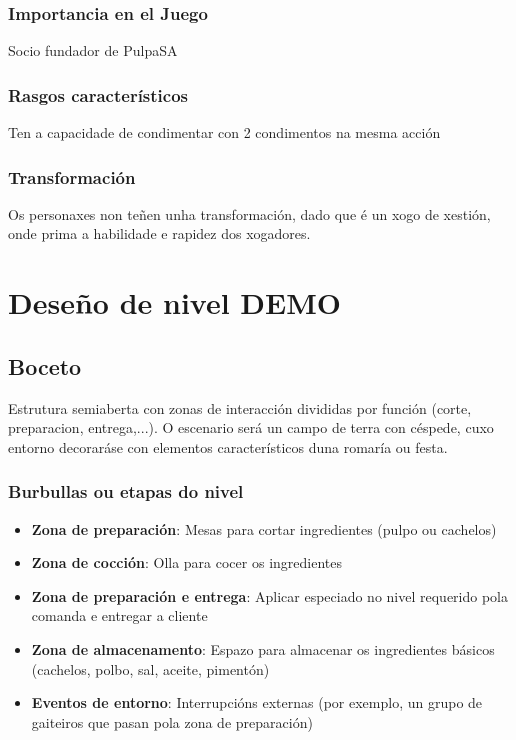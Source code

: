 \documentclass{report}  %
\begin{document}
\subsubsection{Importancia en el Juego}
Socio fundador de PulpaSA \footnotemark[1]
\subsubsection{Rasgos característicos}
Ten a capacidade de condimentar con 2 condimentos na mesma acción \footnotemark[2]
\subsubsection{Transformación}
Os personaxes non teñen unha transformación, dado que é un xogo de xestión, onde prima a habilidade e rapidez dos xogadores.


\newpage
\section{Deseño de nivel DEMO}
\subsection{Boceto}
Estrutura semiaberta con zonas de interacción divididas por función (corte, preparacion, entrega,...). O escenario
será un campo de terra con céspede, cuxo entorno decoraráse con elementos característicos duna romaría ou festa.

\subsubsection{Burbullas ou etapas do nivel}
\begin{itemize}
    \item \textbf{Zona de preparación}: Mesas para cortar ingredientes (pulpo ou cachelos)
    \item \textbf{Zona de cocción}: Olla para cocer os ingredientes
    \item \textbf{Zona de preparación e entrega}: Aplicar especiado no nivel requerido pola comanda e entregar a cliente
    \item \textbf{Zona de almacenamento}: Espazo para almacenar os ingredientes básicos (cachelos, polbo, sal, aceite, pimentón)
    \item \textbf{Eventos de entorno}: Interrupcións externas (por exemplo, un grupo de gaiteiros que pasan pola zona de preparación)
\end{itemize}
\end{document}
